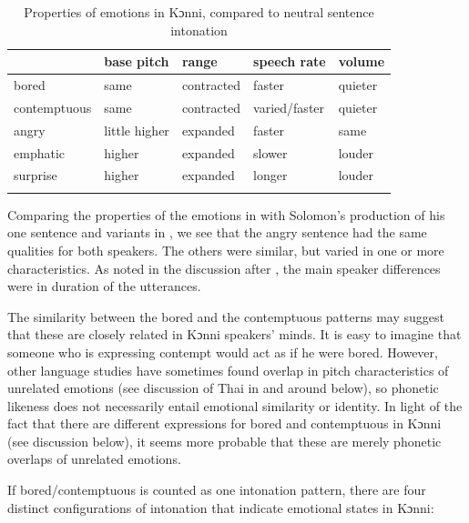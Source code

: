 \documentclass[output=paper]{langsci/langscibook}
\begin{document}
\begin{table}
\begin{tabular}{lllll} 
\lsptoprule
& base pitch & range & speech rate & volume\\\midrule
bored & same & contracted & faster & quieter\\
contemptuous & same & contracted & varied/faster & quieter\\
angry & little higher & expanded & faster & same\\
emphatic & higher & expanded & slower & louder\\
surprise & higher & expanded & longer & louder\\
\lspbottomrule
\end{tabular}

\caption{Properties of emotions in Kɔnni, compared to neutral sentence intonation}
\label{tab:5.cahill}

\end{table}


Comparing the properties of the emotions in  with Solomon's production of his one sentence and variants in , we see that the angry sentence had the same qualities for both speakers. The others were similar, but varied in one or more characteristics. As noted in the discussion after , the main speaker differences were in duration of the utterances.

The similarity between the bored and the contemptuous patterns may suggest that these are closely related in Kɔnni speakers' minds. It is easy to imagine that someone who is expressing contempt would act as if he were bored. However, other language studies have sometimes found overlap in pitch characteristics of unrelated emotions (see discussion of Thai in and around  below), so phonetic likeness does not necessarily entail emotional similarity or identity. In light of the fact that there are different expressions for bored and contemptuous in Kɔnni (see discussion below), it seems more probable that these are merely phonetic overlaps of unrelated emotions.

If bored/contemptuous is counted as one intonation pattern, there are four distinct configurations of intonation that indicate emotional states in Kɔnni:
\end{document}

